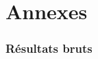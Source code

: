 \part*{Annexes}

\stopcontents

\startcontents[sections]

\setcounter{section}{0}

\newpage

\section{Résultats bruts}
